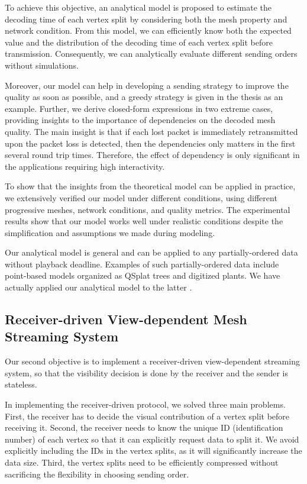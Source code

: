 \documentclass[11pt, a4paper]{report}
\begin{document}
    To achieve this objective, an analytical model is proposed
    to estimate the decoding time of each vertex split by considering both
    the mesh property and network condition. 
    From this model, we can efficiently know both the expected 
    value and the distribution of the decoding time of each
    vertex split before transmission. Consequently, 
    we can analytically evaluate different sending orders without simulations.
    
    Moreover, our model can help in developing a sending
    strategy to improve the quality as soon as possible,
    and a greedy strategy is given in the thesis as an example. 
    Further, we derive closed-form expressions in two extreme cases,
    providing insights to the importance of dependencies on the
    decoded mesh quality. The main insight is that if each lost packet
    is immediately retransmitted upon the packet loss is detected, 
    then the dependencies only matters in the first several round trip times. 
    Therefore, the effect of dependency is only significant in the applications
    requiring high interactivity. 

    To show that the insights from the theoretical model can be applied
    in practice, we extensively verified our model under different conditions,
    using different progressive meshes, network conditions, and quality metrics. 
    The experimental results show that our model works well under realistic 
    conditions despite the simplification and assumptions we made during
    modeling.

    Our analytical model is general and can be applied to any 
    partially-ordered data without playback deadline.
    Examples of such partially-ordered data include point-based models 
    organized as QSplat trees \cite{rusinkiewicz:qsplat} and digitized plants.  
    We have actually applied our analytical model to the latter \cite{plant:seb}.
    
    \subsection{Receiver-driven View-dependent Mesh Streaming System}
    Our second objective is to implement a receiver-driven view-dependent streaming system,
    so that the visibility decision is done by the receiver and the sender is stateless.
    
    In implementing the receiver-driven protocol, we solved three main problems.
    First, the receiver has to decide the visual contribution 
    of a vertex split before receiving it.
    Second, the receiver needs to know the unique ID
    (identification number) of each vertex so that it
    can explicitly request data to split it. 
    We avoid explicitly including the IDs in the vertex splits,
    as it will significantly increase the data size.
    Third, the vertex splits need to be efficiently compressed without
    sacrificing the flexibility in choosing sending order.
    
\end{document}
